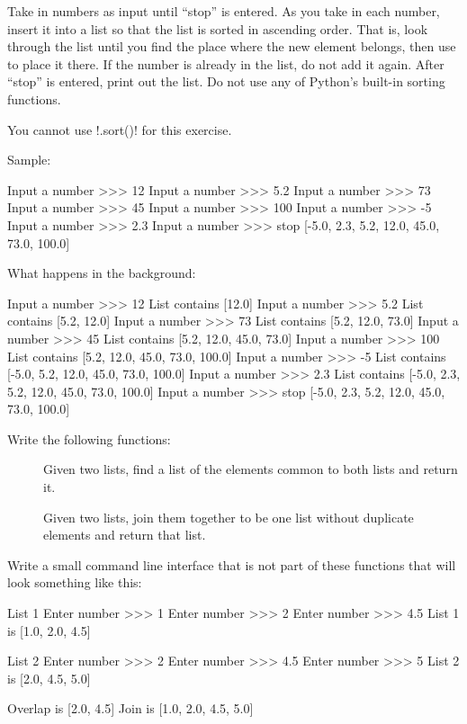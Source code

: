 \documentclass[11pt]{cselabheader}
\begin{document}
\begin{ex}[sorted.py] Take in numbers as input until ``stop'' is entered. As you
  take in each number, insert it into a list so that the list is sorted in
  ascending order. That is, look through the list until you find the place where
  the new element belongs, then use  to place it there.
  If the number is already in the list, do not add it again. After ``stop'' is
  entered, print out the list. Do not use any of Python's built-in sorting
  functions.

  You cannot use \pythoninline!.sort()! for this exercise.

  Sample:

  \begin{verbatimcode}
Input a number >>> 12
Input a number >>> 5.2
Input a number >>> 73
Input a number >>> 45
Input a number >>> 100
Input a number >>> -5
Input a number >>> 2.3
Input a number >>> stop
[-5.0, 2.3, 5.2, 12.0, 45.0, 73.0, 100.0]
  \end{verbatimcode}

  What happens in the background:

  \begin{verbatimcode}
Input a number >>> 12
List contains [12.0]
Input a number >>> 5.2
List contains [5.2, 12.0]
Input a number >>> 73
List contains [5.2, 12.0, 73.0]
Input a number >>> 45
List contains [5.2, 12.0, 45.0, 73.0]
Input a number >>> 100
List contains [5.2, 12.0, 45.0, 73.0, 100.0]
Input a number >>> -5
List contains [-5.0, 5.2, 12.0, 45.0, 73.0, 100.0]
Input a number >>> 2.3
List contains [-5.0, 2.3, 5.2, 12.0, 45.0, 73.0, 100.0]
Input a number >>> stop
[-5.0, 2.3, 5.2, 12.0, 45.0, 73.0, 100.0]
  \end{verbatimcode}

\end{ex}

\begin{ex}[sets.py]
  Write the following functions:

  \begin{description}
    \item[] Given two lists, find a list of the elements
      common to both lists and return it.
    \item[] Given two lists, join them together to be one
      list without duplicate elements and return that list.
  \end{description}

  Write a small command line interface that is not part of these functions that
  will look something like this:

  \begin{verbatimcode}
List 1
Enter number >>> 1
Enter number >>> 2
Enter number >>> 4.5
List 1 is [1.0, 2.0, 4.5]

List 2
Enter number >>> 2
Enter number >>> 4.5
Enter number >>> 5
List 2 is [2.0, 4.5, 5.0]

Overlap is [2.0, 4.5]
Join is [1.0, 2.0, 4.5, 5.0]
  \end{verbatimcode}

\end{ex}
\end{document}
